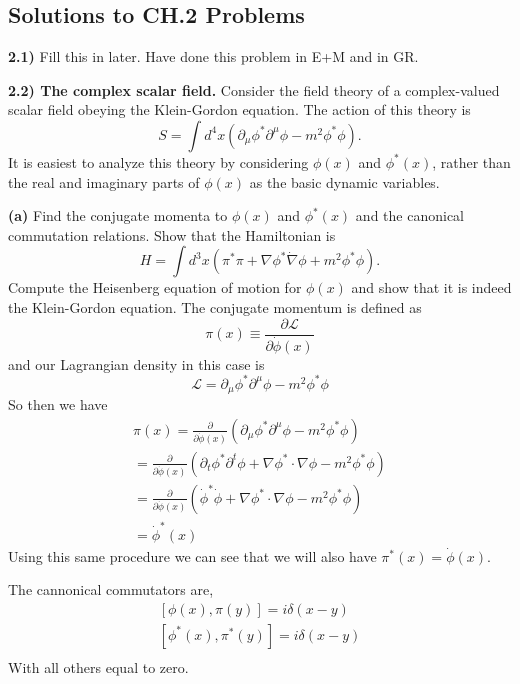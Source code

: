 \documentclass{article}
\numberwithin{equation}{section}
\newcommand{\Lagr}{\mathcal{L}}  %
\newcommand{\dmu}{\partial_{\mu}}
\newcommand{\Dmu}{\partial^{\mu}}
\newcommand{\beq}{\begin{equation}}
\newcommand{\eeq}{\end{equation}}
\begin{document}

\subsection{Solutions to CH.2 Problems}

\textbf{2.1)} Fill this in later. Have done this problem in E+M and in GR.

\vspace{10mm}

\noindent
\textbf{ 2.2) The complex scalar field.} Consider the field theory of a complex-valued scalar field obeying the Klein-Gordon equation.
 The action of this theory is
\beq
    S = \int d^4x (\dmu \phi^* \Dmu \phi - m^2 \phi^* \phi).
\eeq
It is easiest to analyze this theory by considering $\phi(x)$ and $\phi^*(x)$, rather than the real and imaginary parts of $\phi(x)$ as the
basic dynamic variables.

\textbf{(a)} Find the conjugate momenta to $\phi(x)$ and $\phi^*(x)$ and the canonical commutation relations. Show that the Hamiltonian is
\beq
    H = \int d^3x (\pi^*\pi + \nabla\phi^* \dot \nabla \phi + m^2 \phi^*\phi).
\eeq
Compute the Heisenberg equation of motion for $\phi(x)$ and show that it is indeed the Klein-Gordon equation.
\vspace{5mm}
    The conjugate momentum is defined as
    \beq
        \pi(x) \equiv \frac{\partial \Lagr}{\partial \dot \phi(x)}
    \eeq
    and our Lagrangian density in this case is
    \beq
        \Lagr = \dmu \phi^* \Dmu \phi - m^2 \phi^*\phi
    \eeq
    So then we have
    \beq
    \begin{split}
        \pi(x) = \frac{\partial}{\partial \dot \phi(x)}(\dmu \phi^* \Dmu \phi - m^2\phi^*\phi)
       \\ = \frac{\partial}{\partial \dot \phi(x)}( \partial_{t}\phi^* \partial^{t}\phi + \nabla\phi^* \cdot \nabla\phi- m^2\phi^*\phi)
       \\ =\frac{\partial}{\partial \dot \phi(x)}(\dot\phi^* \dot\phi+ \nabla\phi^* \cdot \nabla\phi- m^2\phi^*\phi)
       \\ = \dot\phi^*(x)
    \end{split}
    \eeq
    Using this same procedure we can see that we will also have $\pi^*(x) = \dot \phi(x)$.

    The cannonical commutators are,
    \beq
    \begin{split}
        [\phi(x), \pi(y)] = i \delta(x-y) \\
        [\phi^*(x), \pi^*(y)] = i \delta(x-y)\\
    \end{split}
    \eeq
    With all others equal to zero.
\end{document}
